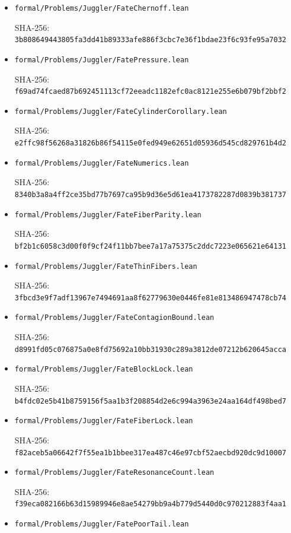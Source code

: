 \documentclass[11pt,a4paper]{article}
\begin{document}
\begin{itemize}
  SHA-256:
  \texttt{\nolinkurl{a5ede4a6d25cec71d6b6c7fb99e577df3335366175dd22f361581456669a72cc}}
\item
  \texttt{\nolinkurl{formal/Problems/Juggler/FateChernoff.lean}}

  SHA-256:
  \texttt{\nolinkurl{3b808649443805fa3dd41b89333afe886f3cbc7e36f1bdae23f6c93fe95a7032}}
\item
  \texttt{\nolinkurl{formal/Problems/Juggler/FatePressure.lean}}

  SHA-256:
  \texttt{\nolinkurl{f69ad74fcaed87b692451113cf72eeadc1182efc0ac8121e255e6b079bf2bbf2}}
\item
  \texttt{\nolinkurl{formal/Problems/Juggler/FateCylinderCorollary.lean}}

  SHA-256:
  \texttt{\nolinkurl{e2ffc98f56268a31826b86f54115e0fed949e62651d05936d545cd829761b4d2}}
\item
  \texttt{\nolinkurl{formal/Problems/Juggler/FateNumerics.lean}}

  SHA-256:
  \texttt{\nolinkurl{8340b3a8a4ff2ce35bd77b7697ca95b9d36e5d61ea4173782287d0839b381737}}
\item
  \texttt{\nolinkurl{formal/Problems/Juggler/FateFiberParity.lean}}

  SHA-256:
  \texttt{\nolinkurl{bf2b1c6058c3d00f0f9cf24f11bb7bee7a17a75375c2ddc7223e065621e64131}}
\item
  \texttt{\nolinkurl{formal/Problems/Juggler/FateThinFibers.lean}}

  SHA-256:
  \texttt{\nolinkurl{3fbcd3e9f7adf13967e7494691aa8f62779630e0446fe81e813486947478cb74}}
\item
  \texttt{\nolinkurl{formal/Problems/Juggler/FateContagionBound.lean}}

  SHA-256:
  \texttt{\nolinkurl{d8991fd05c076875a0e8fd75692a10bb31930c289a3812de07212b620645acca}}
\item
  \texttt{\nolinkurl{formal/Problems/Juggler/FateBlockLock.lean}}

  SHA-256:
  \texttt{\nolinkurl{b4fdc02e5b41b8759156f5aa1b3f208854d2e6c994a3963e24aa164df498bed7}}
\item
  \texttt{\nolinkurl{formal/Problems/Juggler/FateFiberLock.lean}}

  SHA-256:
  \texttt{\nolinkurl{f82aceb5a06642f7f55ea1b1bbee317ea487c46e97cbf52aecbd920dc9d10007}}
\item
  \texttt{\nolinkurl{formal/Problems/Juggler/FateResonanceCount.lean}}

  SHA-256:
  \texttt{\nolinkurl{f39eca082166b63d15989946e8ae54279bb9a4b779d5440d0c970212883f4aa1}}
\item
  \texttt{\nolinkurl{formal/Problems/Juggler/FatePoorTail.lean}}


\end{itemize}
\end{document}
